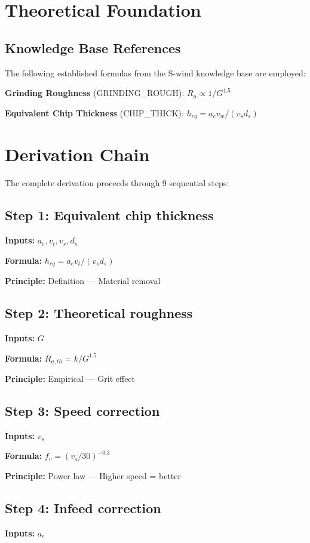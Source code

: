 \documentclass[11pt,twocolumn]{article}
\begin{document}
\section{Theoretical Foundation}

\subsection{Knowledge Base References}
The following established formulas from the S-wind knowledge base are employed:

\textbf{Grinding Roughness} (GRINDING_ROUGH): $R_a \propto 1/G^{1.5}$ \cite{Malkin & Guo}

\textbf{Equivalent Chip Thickness} (CHIP_THICK): $h_{eq} = a_e v_w/(v_s d_s)$ \cite{Grinding Theory}


\section{Derivation Chain}

The complete derivation proceeds through 9 sequential steps:

\subsection*{Step 1: Equivalent chip thickness}
\textbf{Inputs:} $a_e, v_t, v_s, d_s$

\textbf{Formula:} $h_{eq} = a_e v_t / (v_s d_s)$

\textbf{Principle:} Definition --- Material removal

\subsection*{Step 2: Theoretical roughness}
\textbf{Inputs:} $G$

\textbf{Formula:} $R_{a,th} = k / G^{1.5}$

\textbf{Principle:} Empirical --- Grit effect

\subsection*{Step 3: Speed correction}
\textbf{Inputs:} $v_s$

\textbf{Formula:} $f_v = (v_s/30)^{-0.3}$

\textbf{Principle:} Power law --- Higher speed = better

\subsection*{Step 4: Infeed correction}
\textbf{Inputs:} $a_e$
\end{document}
